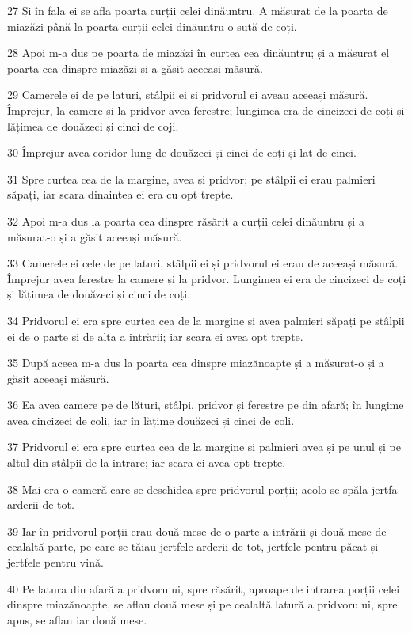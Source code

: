 \par 27 Și în fala ei se afla poarta curții celei dinăuntru. A măsurat de la poarta de miazăzi până la poarta curții celei dinăuntru o sută de coți.
\par 28 Apoi m-a dus pe poarta de miazăzi în curtea cea dinăuntru; și a măsurat el poarta cea dinspre miazăzi și a găsit aceeași măsură.
\par 29 Camerele ei de pe laturi, stâlpii ei și pridvorul ei aveau aceeași măsură. Împrejur, la camere și la pridvor avea ferestre; lungimea era de cincizeci de coți și lățimea de douăzeci și cinci de coji.
\par 30 Împrejur avea coridor lung de douăzeci și cinci de coți și lat de cinci.
\par 31 Spre curtea cea de la margine, avea și pridvor; pe stâlpii ei erau palmieri săpați, iar scara dinaintea ei era cu opt trepte.
\par 32 Apoi m-a dus la poarta cea dinspre răsărit a curții celei dinăuntru și a măsurat-o și a găsit aceeași măsură.
\par 33 Camerele ei cele de pe laturi, stâlpii ei și pridvorul ei erau de aceeași măsură. Împrejur avea ferestre la camere și la pridvor. Lungimea ei era de cincizeci de coți și lățimea de douăzeci și cinci de coți.
\par 34 Pridvorul ei era spre curtea cea de la margine și avea palmieri săpați pe stâlpii ei de o parte și de alta a intrării; iar scara ei avea opt trepte.
\par 35 După aceea m-a dus la poarta cea dinspre miazănoapte și a măsurat-o și a găsit aceeași măsură.
\par 36 Ea avea camere pe de lături, stâlpi, pridvor și ferestre pe din afară; în lungime avea cincizeci de coli, iar în lățime douăzeci și cinci de coli.
\par 37 Pridvorul ei era spre curtea cea de la margine și palmieri avea și pe unul și pe altul din stâlpii de la intrare; iar scara ei avea opt trepte.
\par 38 Mai era o cameră care se deschidea spre pridvorul porții; acolo se spăla jertfa arderii de tot.
\par 39 Iar în pridvorul porții erau două mese de o parte a intrării și două mese de cealaltă parte, pe care se tăiau jertfele arderii de tot, jertfele pentru păcat și jertfele pentru vină.
\par 40 Pe latura din afară a pridvorului, spre răsărit, aproape de intrarea porții celei dinspre miazănoapte, se aflau două mese și pe cealaltă latură a pridvorului, spre apus, se aflau iar două mese.
